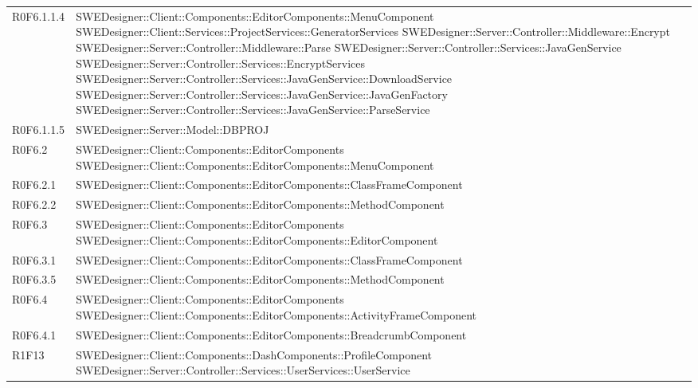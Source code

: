 \begin{center}
\begin{longtable}{p{2cm}!{\VRule[1pt]}p{14cm}}
R0F6.1.1.4 & SWEDesigner::Client::Components::EditorComponents::MenuComponent \newline SWEDesigner::Client::Services::ProjectServices::GeneratorServices \newline SWEDesigner::Server::Controller::Middleware::Encrypt \newline SWEDesigner::Server::Controller::Middleware::Parse \newline SWEDesigner::Server::Controller::Services::JavaGenService \newline SWEDesigner::Server::Controller::Services::EncryptServices \newline SWEDesigner::Server::Controller::Services::JavaGenService::DownloadService \newline SWEDesigner::Server::Controller::Services::JavaGenService::JavaGenFactory \newline SWEDesigner::Server::Controller::Services::JavaGenService::ParseService \\
R0F6.1.1.5 & SWEDesigner::Server::Model::DBPROJ \\
R0F6.2 & SWEDesigner::Client::Components::EditorComponents \newline SWEDesigner::Client::Components::EditorComponents::MenuComponent \\
R0F6.2.1 & SWEDesigner::Client::Components::EditorComponents::ClassFrameComponent \\
R0F6.2.2 & SWEDesigner::Client::Components::EditorComponents::MethodComponent \\
R0F6.3 & SWEDesigner::Client::Components::EditorComponents \newline SWEDesigner::Client::Components::EditorComponents::EditorComponent \\
R0F6.3.1 & SWEDesigner::Client::Components::EditorComponents::ClassFrameComponent \\
R0F6.3.5 & SWEDesigner::Client::Components::EditorComponents::MethodComponent \\
R0F6.4 & SWEDesigner::Client::Components::EditorComponents \newline SWEDesigner::Client::Components::EditorComponents::ActivityFrameComponent \\
R0F6.4.1 & SWEDesigner::Client::Components::EditorComponents::BreadcrumbComponent \\
R1F13 & SWEDesigner::Client::Components::DashComponents::ProfileComponent \newline SWEDesigner::Server::Controller::Services::UserServices::UserService \\

\end{longtable}
\end{center}

